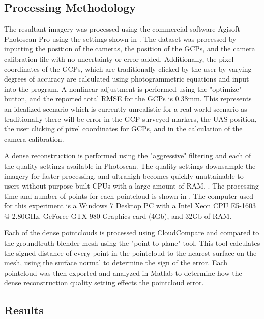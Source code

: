 \subsection{Processing Methodology}
The resultant imagery was processed using the commercial software Agisoft Photoscan Pro using the settings shown in .  The dataset was processed by inputting the position of the cameras, the position of the GCPs, and the camera calibration file with no uncertainty or error added.  Additionally, the pixel coordinates of the GCPs, which are traditionally clicked by the user by varying degrees of accuracy are calculated using photogrammetric equations and input into the program.  A nonlinear adjustment is performed using the "optimize" button, and the reported total RMSE for the GCPs is 0.38mm.  This represents an idealized scenario which is currently unrealistic for a real world scenario as traditionally there will be error in the GCP surveyed markers, the UAS position, the user clicking of pixel coordinates for GCPs, and in the calculation of the camera calibration.  

A dense reconstruction is performed using the "aggressive" filtering and each of the quality settings available in Photoscan.  The quality settings downsample the imagery for faster processing, and ultrahigh becomes quickly unattainable to users without purpose built CPUs with a large amount of RAM. . The processing time and number of points for each pointcloud is shown in .  The computer used for this experiment is a Windows 7 Desktop PC with a Intel Xeon CPU E5-1603 @ 2.80GHz, GeForce GTX 980 Graphics card (4Gb), and 32Gb of RAM.



Each of the dense pointclouds is processed using CloudCompare  and compared to the groundtruth blender mesh using the "point to plane" tool.  This tool calculates the signed distance of every point in the pointcloud to the nearest surface on the mesh, using the surface normal to determine the sign of the error. Each pointcloud was then exported and analyzed in Matlab to determine how the dense reconstruction quality setting effects the pointcloud error.

\subsection{Results}

